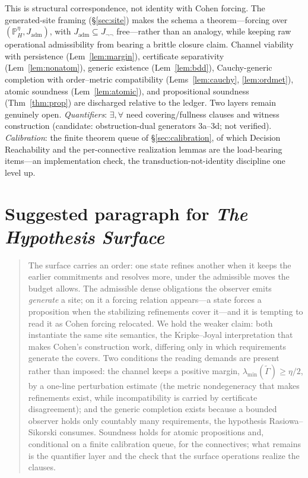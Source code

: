 \documentclass[11pt]{article}
\theoremstyle{definition}
\theoremstyle{remark}
\newcommand{\PHeta}{\mathbb{P}_{H}^{\eta}}
\newcommand{\Jadm}{J_{\mathrm{adm}}}
\newcommand{\Jnn}{J_{\neg\neg}}
\begin{document}
This is structural correspondence, not identity with Cohen forcing. The generated-site framing
(\S\ref{sec:site}) makes the schema a theorem---forcing over $(\PHeta,\Jadm)$, with $\Jadm\subseteq\Jnn$
free---rather than an analogy, while keeping raw operational admissibility from bearing a brittle
closure claim. Channel viability with persistence (Lem~\ref{lem:margin}), certificate separativity
(Lem~\ref{lem:nonatom}), generic existence (Lem~\ref{lem:bdd}), Cauchy-generic completion with
order--metric compatibility (Lems~\ref{lem:cauchy}, \ref{lem:ordmet}), atomic soundness
(Lem~\ref{lem:atomic}), and propositional soundness (Thm~\ref{thm:prop}) are discharged relative to the
ledger. Two layers remain genuinely open. \emph{Quantifiers}: $\exists,\forall$ need covering/fullness
clauses and witness construction (candidate: obstruction-dual generators 3a--3d; not verified).
\emph{Calibration}: the finite theorem queue of \S\ref{sec:calibration}, of which Decision
Reachability and the per-connective realization lemmas are the load-bearing items---an implementation
check, the transduction-not-identity discipline one level up.

\section{Suggested paragraph for \emph{The Hypothesis Surface}}

\begin{quote}
The surface carries an order: one state refines another when it keeps the earlier commitments and
resolves more, under the admissible moves the budget allows. The admissible dense obligations the
observer emits \emph{generate} a site; on it a forcing relation appears---a state forces a proposition
when the stabilizing refinements cover it---and it is tempting to read it as Cohen forcing relocated.
We hold the weaker claim: both instantiate the same site semantics, the Kripke--Joyal interpretation
that makes Cohen's construction work, differing only in which requirements generate the covers. Two
conditions the reading demands are present rather than imposed: the channel keeps a positive margin,
$\lambda_{\min}(\tilde\Gamma)\ge\eta/2$, by a one-line perturbation estimate (the metric nondegeneracy
that makes refinements exist, while incompatibility is carried by certificate disagreement); and the
generic completion exists because a bounded observer holds only countably many requirements, the
hypothesis Rasiowa--Sikorski consumes. Soundness holds for atomic propositions and, conditional on a
finite calibration queue, for the connectives; what remains is the quantifier layer and the check that
the surface operations realize the clauses.
\end{quote}
\end{document}
